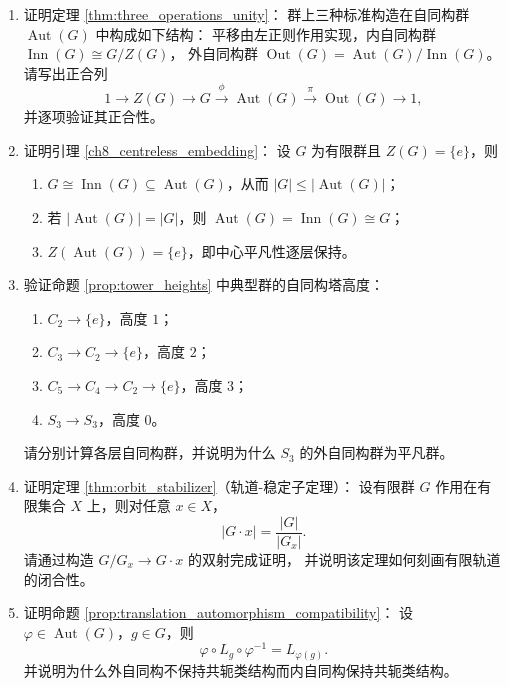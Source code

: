 \begin{enumerate}[leftmargin=3em, label=\textbf{题 \arabic*}]
    \item 证明定理 \ref{thm:three_operations_unity}：
    群上三种标准构造在自同构群 $\operatorname{Aut}(G)$ 中构成如下结构：
    平移由左正则作用实现，内自同构群 $\operatorname{Inn}(G)\cong G/Z(G)$，
    外自同构群 $\operatorname{Out}(G)=\operatorname{Aut}(G)/\operatorname{Inn}(G)$。
    请写出正合列
    \[
    1\to Z(G)\to G\xrightarrow{\phi}\operatorname{Aut}(G)
    \xrightarrow{\pi}\operatorname{Out}(G)\to 1,
    \]
    并逐项验证其正合性。

    \item 证明引理 \ref{ch8_centreless_embedding}：
    设 $G$ 为有限群且 $Z(G)=\{e\}$，则
    \begin{enumerate}[label=(\roman*)]
        \item $G\cong\operatorname{Inn}(G)\subseteq\operatorname{Aut}(G)$，从而 $|G|\le|\operatorname{Aut}(G)|$；
        \item 若 $|\operatorname{Aut}(G)|=|G|$，则 $\operatorname{Aut}(G)=\operatorname{Inn}(G)\cong G$；
        \item $Z(\operatorname{Aut}(G))=\{e\}$，即中心平凡性逐层保持。
    \end{enumerate}

    \item 验证命题 \ref{prop:tower_heights} 中典型群的自同构塔高度：
    \begin{enumerate}[label=(\roman*)]
        \item $C_2\to\{e\}$，高度 $1$；
        \item $C_3\to C_2\to\{e\}$，高度 $2$；
        \item $C_5\to C_4\to C_2\to\{e\}$，高度 $3$；
        \item $S_3\to S_3$，高度 $0$。
    \end{enumerate}
    请分别计算各层自同构群，并说明为什么 $S_3$ 的外自同构群为平凡群。

    \item 证明定理 \ref{thm:orbit_stabilizer}（轨道-稳定子定理）：
    设有限群 $G$ 作用在有限集合 $X$ 上，则对任意 $x\in X$，
    \[
    |G\cdot x|=\frac{|G|}{|G_x|}.
    \]
    请通过构造 $G/G_x\to G\cdot x$ 的双射完成证明，
    并说明该定理如何刻画有限轨道的闭合性。

    \item 证明命题 \ref{prop:translation_automorphism_compatibility}：
    设 $\varphi\in\operatorname{Aut}(G)$，$g\in G$，则
    \[
    \varphi\circ L_g\circ\varphi^{-1}=L_{\varphi(g)}.
    \]
    并说明为什么外自同构不保持共轭类结构而内自同构保持共轭类结构。


\end{enumerate}
